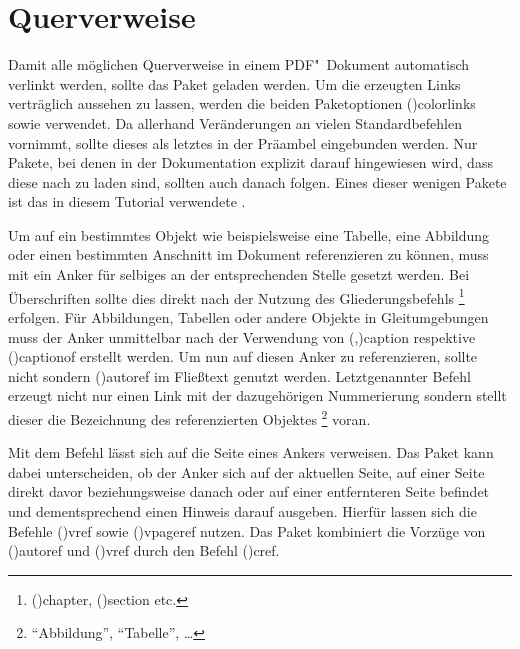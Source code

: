 \documentclass[%
  english,ngerman,%
  cdgeometry=no,DIV=12,%
  cd=false,cdfont=false,cdtitle=true,%
  headings=normal,%
  automark,%
  listof=toc,%
]{tudscrartcl}
\begin{document}
\section{%
  Querverweise%
  \label{sec:references}%
}

Damit alle möglichen Querverweise in einem PDF"~Dokument automatisch verlinkt 
werden, sollte das Paket  geladen werden. Um die erzeugten 
Links verträglich aussehen zu lassen, werden die beiden Paketoptionen 
\Option(){colorlinks} sowie  
verwendet. Da  allerhand Veränderungen an vielen 
Standardbefehlen vornimmt, sollte dieses als letztes in der Präambel 
eingebunden werden. Nur Pakete, bei denen in der Dokumentation explizit darauf 
hingewiesen wird, dass diese nach  zu laden sind, sollten 
auch danach folgen. Eines dieser wenigen Pakete ist das in diesem Tutorial 
verwendete . 
%
\begin{Hint}
\usepackage[colorlinks,linkcolor=blue]{hyperref}

\end{Hint}
%
Um auf ein bestimmtes Objekt wie beispielsweise eine Tabelle, eine Abbildung 
oder einen bestimmten Anschnitt im Dokument referenzieren zu können, muss mit 
 ein Anker für selbiges an der entsprechenden 
Stelle gesetzt werden. Bei Überschriften sollte dies direkt nach der Nutzung 
des Gliederungsbefehls%
\footnote{%
  \Macro(){chapter}, 
  \Macro(){section} etc.%
}
erfolgen. Für Abbildungen, Tabellen oder andere Objekte in Gleitumgebungen 
muss der Anker unmittelbar nach der Verwendung von 
\Macro(,){caption} respektive 
\Macro(){captionof} erstellt werden. Um nun auf diesen 
Anker zu referenzieren, sollte nicht  sondern 
\Macro(){autoref} im Fließtext genutzt werden. 
Letztgenannter Befehl erzeugt nicht nur einen Link mit der dazugehörigen 
Nummerierung sondern stellt dieser die Bezeichnung des referenzierten Objektes%
\footnote{\enquote{Abbildung}, \enquote{Tabelle}, \dots} voran. 

Mit dem Befehl  lässt sich auf die Seite eines Ankers verweisen.
Das Paket  kann dabei unterscheiden, ob der Anker sich auf 
der aktuellen Seite, auf einer Seite direkt davor beziehungsweise danach oder 
auf einer entfernteren Seite befindet und dementsprechend einen Hinweis darauf 
ausgeben. Hierfür lassen sich die Befehle \Macro(){vref} 
sowie \Macro(){vpageref} nutzen. Das Paket  
kombiniert die Vorzüge von \Macro(){autoref} und 
\Macro(){vref} durch den Befehl 
\Macro(){cref}.
\end{document}
